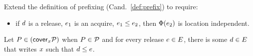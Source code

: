 \begin{definition}
  \label{def:cover}
  Extend the definition of prefixing (Cand.~\ref{def:prefix}) to require:
  \begin{itemize}
  \item[{\labeltextsc[P6]{(P6)}{6}}]
    if $d$ is a release, $e_1$ is an acquire, $e_1\le e_2$, then $\Phi(e_2)$
    is location independent.
  \end{itemize}  



  
  Let $\aPS\in(\relfilt[]{\aLoc} \aPSS)$
  when %
  $P\in\mathcal{P}$ and for every release $e\in E$, there is some
  $d\in E$ that writes $x$ such that $d \le e$.


\end{definition}
